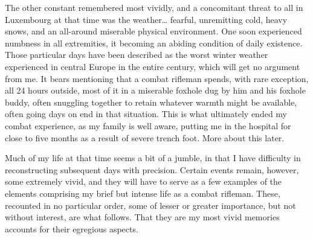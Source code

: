 \documentclass[../m3y]{subfiles}
\begin{document}
The other constant remembered most vividly, and a concomitant threat to all in Luxembourg at that time was the weather… fearful, unremitting cold, heavy snows, and an all-around miserable physical environment. One soon experienced numbness in all extremities, it becoming an abiding condition of daily existence. Those particular days have been described as the worst winter weather experienced in central Europe in the entire century, which will get no argument from me. It bears mentioning that a combat rifleman spends, with rare exception, all 24 hours outside, most of it in a miserable foxhole dug by him and his foxhole buddy, often snuggling together to retain whatever warmth might be available, often going days on end in that situation. This is what ultimately ended my combat experience, as my family is well aware, putting me in the hospital for close to five months as a result of severe trench foot. More about this later.

Much of my life at that time seems a bit of a jumble, in that I have difficulty in reconstructing subsequent days with precision. Certain events remain, however, some extremely vivid, and they will have to serve as a few examples of the elements comprising my brief but intense life as a combat rifleman. These, recounted in no particular order, some of lesser or greater importance, but not without interest, are what follows. That they are my most vivid memories accounts for their egregious aspects.
\end{document}
